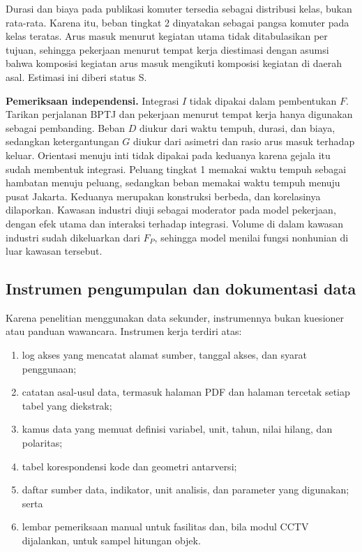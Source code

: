 \documentclass[12pt,a4paper,oneside,openany,indonesian]{report}
\begin{document}
Durasi dan biaya pada publikasi komuter tersedia sebagai distribusi
kelas, bukan rata-rata. Karena itu, beban tingkat 2 dinyatakan sebagai
pangsa komuter pada kelas teratas. Arus masuk menurut kegiatan utama
tidak ditabulasikan per tujuan, sehingga pekerjaan menurut tempat kerja
diestimasi dengan asumsi bahwa komposisi kegiatan arus masuk mengikuti
komposisi kegiatan di daerah asal. Estimasi ini diberi status S.

\textbf{Pemeriksaan independensi.} Integrasi $I$ tidak dipakai dalam
pembentukan $F$. Tarikan perjalanan BPTJ dan pekerjaan menurut tempat
kerja hanya digunakan sebagai pembanding. Beban $D$ diukur dari waktu tempuh,
durasi, dan biaya, sedangkan ketergantungan $G$ diukur dari asimetri dan
rasio arus masuk terhadap keluar. Orientasi menuju inti tidak dipakai
pada keduanya karena gejala itu sudah membentuk integrasi. Peluang
tingkat 1 memakai waktu tempuh sebagai hambatan menuju peluang,
sedangkan beban memakai waktu tempuh menuju pusat Jakarta. Keduanya
merupakan konstruksi berbeda, dan korelasinya dilaporkan. Kawasan
industri diuji sebagai moderator pada model pekerjaan, dengan efek
utama dan interaksi terhadap integrasi. Volume di dalam kawasan industri
sudah dikeluarkan dari $F_P$, sehingga model menilai fungsi nonhunian di
luar kawasan tersebut.

\subsection{Instrumen pengumpulan dan dokumentasi
data}\label{instrumen-pengumpulan-dan-dokumentasi-data}

Karena penelitian menggunakan data sekunder, instrumennya bukan
kuesioner atau panduan wawancara. Instrumen kerja terdiri atas:

\begin{enumerate}
\tightlist
\item
  log akses yang mencatat alamat sumber, tanggal akses, dan syarat
  penggunaan;
\item
  catatan asal-usul data, termasuk halaman PDF dan halaman tercetak setiap
  tabel yang diekstrak;
\item
  kamus data yang memuat definisi variabel, unit, tahun, nilai hilang,
  dan polaritas;
\item
  tabel korespondensi kode dan geometri antarversi;
\item
  daftar sumber data, indikator, unit analisis, dan parameter yang
  digunakan; serta
\item
  lembar pemeriksaan manual untuk fasilitas dan, bila modul CCTV
  dijalankan, untuk sampel hitungan objek.
\end{enumerate}
\end{document}
